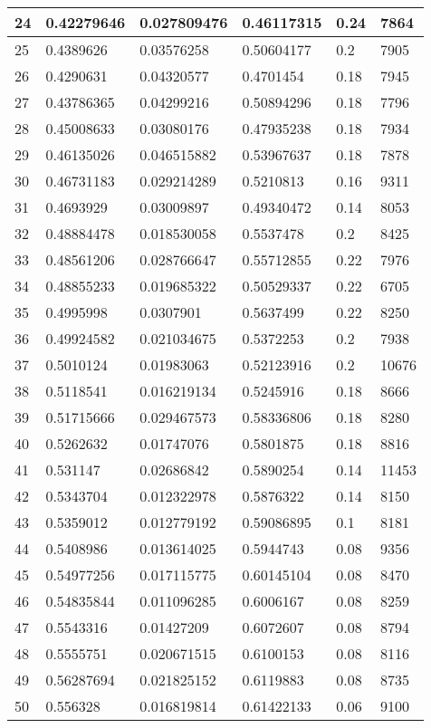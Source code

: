 \begin{longtable}{|l|l|l|l|l|l|}
24 & 0.42279646 & 0.027809476 & 0.46117315 & 0.24 & 7864 \\ \hline 
25 & 0.4389626 & 0.03576258 & 0.50604177 & 0.2 & 7905 \\ \hline 
26 & 0.4290631 & 0.04320577 & 0.4701454 & 0.18 & 7945 \\ \hline 
27 & 0.43786365 & 0.04299216 & 0.50894296 & 0.18 & 7796 \\ \hline 
28 & 0.45008633 & 0.03080176 & 0.47935238 & 0.18 & 7934 \\ \hline 
29 & 0.46135026 & 0.046515882 & 0.53967637 & 0.18 & 7878 \\ \hline 
30 & 0.46731183 & 0.029214289 & 0.5210813 & 0.16 & 9311 \\ \hline 
31 & 0.4693929 & 0.03009897 & 0.49340472 & 0.14 & 8053 \\ \hline 
32 & 0.48884478 & 0.018530058 & 0.5537478 & 0.2 & 8425 \\ \hline 
33 & 0.48561206 & 0.028766647 & 0.55712855 & 0.22 & 7976 \\ \hline 
34 & 0.48855233 & 0.019685322 & 0.50529337 & 0.22 & 6705 \\ \hline 
35 & 0.4995998 & 0.0307901 & 0.5637499 & 0.22 & 8250 \\ \hline 
36 & 0.49924582 & 0.021034675 & 0.5372253 & 0.2 & 7938 \\ \hline 
37 & 0.5010124 & 0.01983063 & 0.52123916 & 0.2 & 10676 \\ \hline 
38 & 0.5118541 & 0.016219134 & 0.5245916 & 0.18 & 8666 \\ \hline 
39 & 0.51715666 & 0.029467573 & 0.58336806 & 0.18 & 8280 \\ \hline 
40 & 0.5262632 & 0.01747076 & 0.5801875 & 0.18 & 8816 \\ \hline 
41 & 0.531147 & 0.02686842 & 0.5890254 & 0.14 & 11453 \\ \hline 
42 & 0.5343704 & 0.012322978 & 0.5876322 & 0.14 & 8150 \\ \hline 
43 & 0.5359012 & 0.012779192 & 0.59086895 & 0.1 & 8181 \\ \hline 
44 & 0.5408986 & 0.013614025 & 0.5944743 & 0.08 & 9356 \\ \hline 
45 & 0.54977256 & 0.017115775 & 0.60145104 & 0.08 & 8470 \\ \hline 
46 & 0.54835844 & 0.011096285 & 0.6006167 & 0.08 & 8259 \\ \hline 
47 & 0.5543316 & 0.01427209 & 0.6072607 & 0.08 & 8794 \\ \hline 
48 & 0.5555751 & 0.020671515 & 0.6100153 & 0.08 & 8116 \\ \hline 
49 & 0.56287694 & 0.021825152 & 0.6119883 & 0.08 & 8735 \\ \hline 
50 & 0.556328 & 0.016819814 & 0.61422133 & 0.06 & 9100 \\ \hline 
\end{longtable}
